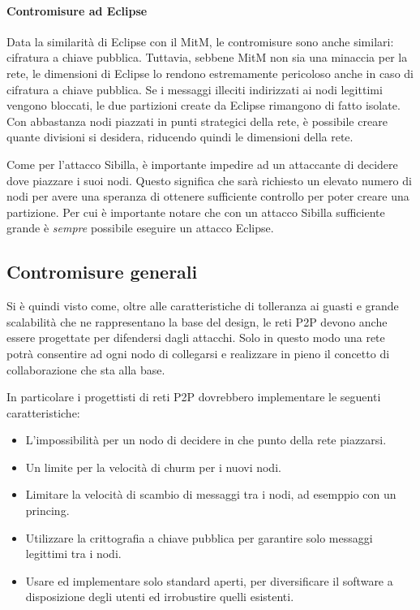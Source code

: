 \paragraph{Contromisure ad Eclipse}\label{contromisure-ad-eclipse}

Data la similarità di Eclipse con il MitM, le contromisure sono anche
similari: cifratura a chiave pubblica. Tuttavia, sebbene MitM non sia
una minaccia per la rete, le dimensioni di Eclipse lo rendono
estremamente pericoloso anche in caso di cifratura a chiave pubblica. Se
i messaggi illeciti indirizzati ai nodi legittimi vengono bloccati, le
due partizioni create da Eclipse rimangono di fatto isolate. Con
abbastanza nodi piazzati in punti strategici della rete, è possibile
creare quante divisioni si desidera, riducendo quindi le dimensioni
della rete.

Come per l'attacco Sibilla, è importante impedire ad un attaccante di
decidere dove piazzare i suoi nodi. Questo significa che sarà richiesto
un elevato numero di nodi per avere una speranza di ottenere sufficiente
controllo per poter creare una partizione. Per cui è importante notare
che con un attacco Sibilla sufficiente grande è \emph{sempre} possibile
eseguire un attacco Eclipse.

\subsection{Contromisure generali}\label{contromisure-generali}

Si è quindi visto come, oltre alle caratteristiche di tolleranza ai
guasti e grande scalabilità che ne rappresentano la base del design, le
reti P2P devono anche essere progettate per difendersi dagli attacchi.
Solo in questo modo una rete potrà consentire ad ogni nodo di collegarsi
e realizzare in pieno il concetto di collaborazione che sta alla base.

In particolare i progettisti di reti P2P dovrebbero implementare le
seguenti caratteristiche:

\begin{itemize}
\itemsep1pt\parskip0pt
\item
  L'impossibilità per un nodo di decidere in che punto della rete
  piazzarsi.
\item
  Un limite per la velocità di churm per i nuovi nodi.
\item
  Limitare la velocità di scambio di messaggi tra i nodi, ad esemppio
  con un princing.
\item
  Utilizzare la crittografia a chiave pubblica per garantire solo
  messaggi legittimi tra i nodi.
\item
  Usare ed implementare solo standard aperti, per diversificare il
  software a disposizione degli utenti ed irrobustire quelli esistenti.
\end{itemize}


